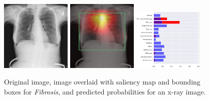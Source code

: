 \documentclass[8pt]{beamer}
\begin{document}
\begin{frame}
\begin{figure}[H]
  \centering
  \includegraphics[width=0.3\textwidth]{images/preds/fibrosis}\hspace{0.01\textwidth}%
  \includegraphics[width=0.3\textwidth]{images/preds/fibrosis_cam}\hspace{0.01\textwidth}%
  \includegraphics[width=0.3\textwidth]{images/preds/fibrosis_probs}\\[0.01\textwidth]
  \caption{Original image, image overlaid with saliency map and bounding boxes
    for \emph{Fibrosis}, and predicted probabilities for an x-ray image.}
  \label{examples_12}
\end{figure}
\end{frame}
\end{document}
